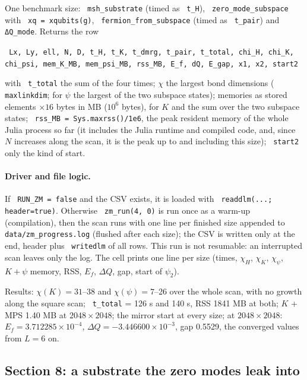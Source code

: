\documentclass[11pt]{article}
\renewenvironment{function}[1]{\par\Needspace{7\baselineskip}\medskip\noindent{\raggedright\textbf{\large\texttt{\hyphenchar\font=-1 #1}}\par}\nopagebreak}{\par\medskip}
\renewcommand{\code}[1]{\texttt{\hyphenchar\font=-1 #1}}
\begin{document}
\begin{function}{zm\_run(Lx, Ly; ℓ=12)}
One benchmark size: \code{msh\_substrate} (timed as \code{t\_H}), \code{zero\_mode\_subspace} with \code{xq = xqubits(g)},
\code{fermion\_from\_subspace} (timed as \code{t\_pair}) and \code{ΔQ\_mode}. Returns the row
\begin{center}\small
\code{Lx, Ly, ell, N, D, t\_H, t\_K, t\_dmrg, t\_pair, t\_total, chi\_H, chi\_K, chi\_psi, mem\_K\_MB, mem\_psi\_MB, rss\_MB, E\_f, dQ, E\_gap, x1, x2, start2}
\end{center}
with \code{t\_total} the sum of the four times; $\chi$ the largest bond dimensions (\code{maxlinkdim}; for $\psi$ the largest of the two
subspace states); memories as stored elements $\times16$ bytes in MB ($10^6$ bytes), for $K$ and the sum over the two subspace states;
\code{rss\_MB = Sys.maxrss()/1e6}, the peak resident memory of the whole Julia process so far (it includes the Julia runtime and compiled
code, and, since $N$ increases along the scan, it is the peak up to and including this size); \code{start2} only the kind of start.
\end{function}

\paragraph{Driver and file logic.} If \code{RUN\_ZM = false} and the CSV exists, it is loaded with \code{readdlm(...; header=true)}. Otherwise
\code{zm\_run(4, 0)} is run once as a warm-up (compilation), then the scan runs with one line per finished size appended to
\code{data/zm\_progress.log} (flushed after each size); the CSV is written only at the end, header plus \code{writedlm} of all rows. This run is
not resumable: an interrupted scan leaves only the log. The cell prints one line per size (times, $\chi_H$, $\chi_K$, $\chi_\psi$, $K+\psi$ memory,
RSS, $E_f$, $\Delta Q$, gap, start of $\psi_2$).

Results: $\chi(K) = 31$--38 and $\chi(\psi) = 7$--26 over the whole scan, with no growth along the square scan; \code{t\_total} = 126 s and 140 s, RSS 1841 MB at both;
$K$ + MPS 1.40 MB at $2048\times2048$; the mirror start at every size; at $2048\times2048$: $E_f = 3.712285\times10^{-4}$, $\Delta Q = -3.446600\times10^{-3}$, gap 0.5529, the converged values from $L = 6$ on.

\subsection{Section 8: a substrate the zero modes leak into}
\end{document}

